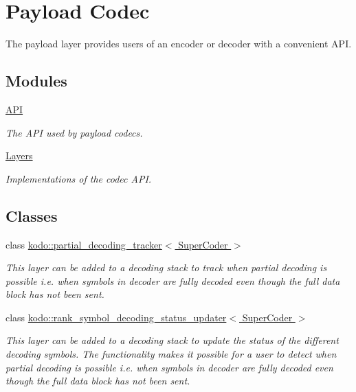 \hypertarget{group__payload__codec}{\section{Payload Codec}
\label{group__payload__codec}
}


The payload layer provides users of an encoder or decoder with a convenient A\-P\-I.  


\subsection*{Modules}
\begin{DoxyCompactItemize}
\item 
\hyperlink{group__payload__codec__api}{A\-P\-I}
\begin{DoxyCompactList}\small\item\em The A\-P\-I used by payload codecs. \end{DoxyCompactList}\item 
\hyperlink{group__payload__codec__layers}{Layers}
\begin{DoxyCompactList}\small\item\em Implementations of the codec A\-P\-I. \end{DoxyCompactList}\end{DoxyCompactItemize}
\subsection*{Classes}
\begin{DoxyCompactItemize}
\item 
class \hyperlink{classkodo_1_1partial__decoding__tracker}{kodo\-::partial\-\_\-decoding\-\_\-tracker$<$ Super\-Coder $>$}
\begin{DoxyCompactList}\small\item\em This layer can be added to a decoding stack to track when partial decoding is possible i.\-e. when symbols in decoder are fully decoded even though the full data block has not been sent. \end{DoxyCompactList}\item 
class \hyperlink{classkodo_1_1rank__symbol__decoding__status__updater}{kodo\-::rank\-\_\-symbol\-\_\-decoding\-\_\-status\-\_\-updater$<$ Super\-Coder $>$}
\begin{DoxyCompactList}\small\item\em This layer can be added to a decoding stack to update the status of the different decoding symbols. The functionality makes it possible for a user to detect when partial decoding is possible i.\-e. when symbols in decoder are fully decoded even though the full data block has not been sent. \end{DoxyCompactList}\end{DoxyCompactItemize}


